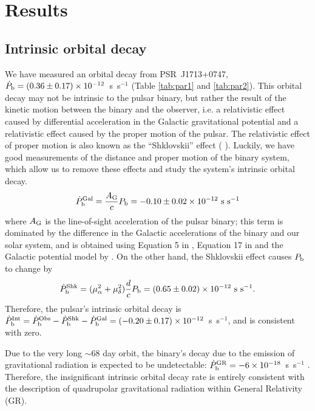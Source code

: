 \section{Results}
\label{sec:res}

\subsection{Intrinsic orbital decay}
\label{sec:obdecay}
We have measured an orbital decay from PSR~J1713+0747, $\dot{P}_{\rm b} =
(0.36\pm0.17)\times10^{-12}$~s~s$^{-1}$ (Table \ref{tab:par1} and \ref{tab:par2}).
This orbital decay may not be intrinsic to the pulsar binary, but rather the
result of the kinetic motion between the binary and the
observer, i.e. a relativistic effect caused by differential 
acceleration in the Galactic gravitational potential
\citep{dt91} and a relativistic effect caused by the proper motion of the
pulsar. The relativistic effect
of proper motion is also known as the ``Shklovskii'' effect (
\citealt{shk70}). Luckily, we have good measurements of the distance and proper
motion of the binary system, which allow us to remove these effects and study the system's intrinsic orbital decay.
\begin{equation}
\dot{P}_{\rm b}^{\rm Gal} = \frac{A_{\rm G}}{c} P_{\rm b} =
-0.10\pm0.02\times10^{-12}~{\rm s~s^{-1}}
\end{equation}
where $A_{\rm G}$ is the line-of-sight acceleration of the pulsar binary;
this term is dominated by the difference in the Galactic accelerations of the
binary and our solar system, and is obtained using
Equation 5 in \citet{nt95}, Equation 17 in \citet{lwj+09} and the Galactic
potential model by \citet{hf04a}.
On the other hand, the Shklovskii effect causes $P_{\rm b}$ to
change by
\begin{equation}
\dot{P}_{\rm b}^{\rm Shk} = (\mu_{\alpha}^2+\mu_{\delta}^2)\frac{d}{c}P_{\rm
b} = (0.65\pm0.02)\times10^{-12}~{\rm s~s^{-1}}.
\end{equation}
Therefore, the pulsar's intrinsic orbital decay is $\dot{P}_{\rm b}^{\rm Int}
= \dot{P}_{\rm b}^{\rm Obs} - \dot{P}_{\rm b}^{\rm Shk} - \dot{P}_{\rm b}^{\rm
Gal} = (-0.20\pm0.17)\times10^{-12}$~s~s$^{-1}$, and is consistent with zero.

Due to the very long $\sim$68 day orbit, the binary's decay due to the
emission of gravitational
radiation is expected to be undetectable: $\dot{P}_{\rm b}^{\rm GR} =
-6\times10^{-18}$~s~s$^{-1}$ \citep{lk05}.  Therefore, the insignificant
intrinsic orbital decay rate is entirely consistent with the
description of quadrupolar gravitational radiation within General
Relativity (GR).

